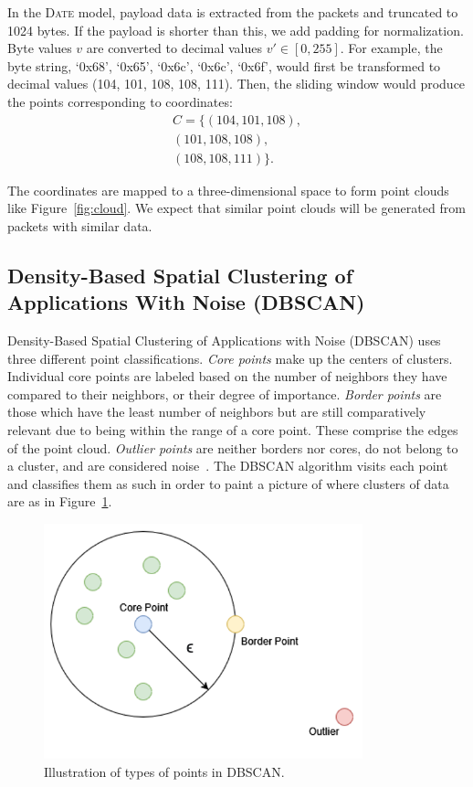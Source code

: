 In the \textsc{Date} model, payload data is extracted from the packets and truncated to 1024 bytes. If the payload is shorter than this, we add padding for normalization. Byte values $v$ are converted to decimal values $v' \in [0,255]$. For example, the byte string, `0x68', `0x65', `0x6c', `0x6c', `0x6f', would first be transformed to decimal values (104, 101, 108, 108, 111). Then, the sliding window would produce the points corresponding to coordinates:
\begin{equation}
\begin{split}
     C =
\{(104, 101, 108), \\ (101, 108, 108), \\ (108, 108, 111)\}.
\end{split}
\end{equation}

The coordinates are mapped to a three-dimensional space to form point clouds like Figure~\ref{fig:cloud}. We expect that similar point clouds will be generated from packets with similar data.


\subsection{Density-Based Spatial Clustering of Applications With Noise (DBSCAN)}

Density-Based Spatial Clustering of Applications with Noise (DBSCAN) uses three different point classifications. \textit{Core points} make up the centers of clusters. Individual core points are labeled based on the number of neighbors they have compared to their neighbors, or their degree of importance. \textit{Border points} are those which have the least number of neighbors but are still comparatively relevant due to being within the range of a core point. These comprise the edges of the point cloud. \textit{Outlier points} are neither borders nor cores, do not belong to a cluster, and are considered noise~\cite{schubert2017dbscan}. The DBSCAN algorithm visits each point and classifies them as such in order to paint a picture of where clusters of data are as in Figure~\ref{fig:dbscan}.

\begin{figure} [ht!]
\centering
\includegraphics[scale=0.4]{chapters/6/img/dbscan.drawio.png}
\caption{Illustration of types of points in DBSCAN.}
\label{fig:dbscan}
\end{figure}

